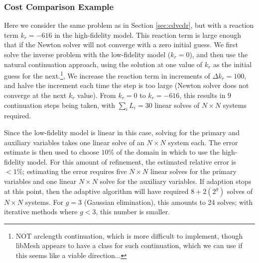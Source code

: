 \subsubsection{Cost Comparison Example}

Here we consider the same problem as in Section \ref{sec:cdvcdr}, but with a reaction term $k_r=-616$ in the high-fidelity model. This reaction term is large enough that if the Newton solver will not converge with a zero initial guess. We first solve the inverse problem with the low-fidelity model ($k_r=0$), and then use the natural continuation approach, using the solution at one value of $k_r$ as the initial guess for the next.\footnote{NOT arclength continuation, which is more difficult to implement, though libMesh appears to have a class for such continuation, which we can use if this seems like a viable direction...}, We increase the reaction term in increments of $\Delta k_r=100$, and halve the increment each time the step is too large (Newton solver does not converge at the next $k_r$ value). From $k_r=0$ to $k_r=-616$, this results in 9 continuation steps being taken, with $\sum_i L_i=30$ linear solves of $N\times N$ systems required.

Since the low-fidelity model is linear in this case, solving for the primary and auxiliary variables takes one linear solve of an $N\times N$ system each. The error estimate is then used to choose $10\%$ of the domain in which to use the high-fidelity model. For this amount of refinement, the estimated relative error is $<1\%$; estimating the error requires five $N\times N$ linear solves for the primary variables and one linear $N\times N$ solve for the auxiliary variables. If adaption stops at this point, then the adaptive algorithm will have required $8+2(2^g)$ solves of $N\times N$ systems. For $g=3$ (Gaussian elimination), this amounts to 24 solves; with iterative methods where $g<3$, this number is smaller.

